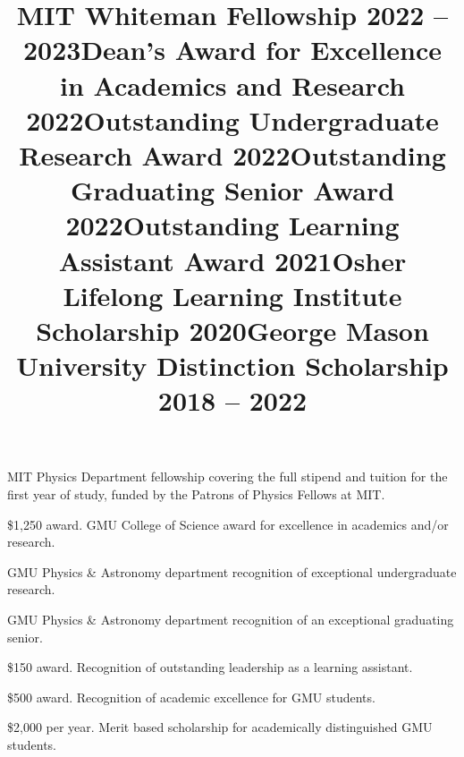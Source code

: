 \documentclass[marg, centered]{res}
\begin{document}
\begin{resume}
\vspace{-0.3cm}
\title{\textbf{MIT Whiteman Fellowship} \hfill \textbf{2022 -- 2023}}
\begin{position}
MIT Physics Department fellowship covering the full stipend and tuition for the first year of study, funded by the Patrons of Physics Fellows at MIT.
\end{position}

\vspace{-0.3cm}
\title{\textbf{Dean's Award for Excellence in Academics and Research} \hfill {\textbf{2022}}}
\begin{position}
\$1,250 award.  GMU College of Science award for excellence in academics and/or research.
\end{position}

\vspace{-0.3cm}
\title{\textbf{Outstanding Undergraduate Research Award} \hfill \textbf{2022}}
\begin{position}
GMU Physics \& Astronomy department recognition of exceptional undergraduate research.
\end{position}

\vspace{-0.3cm}
\title{\textbf{Outstanding Graduating Senior Award} \hfill \textbf{2022}}
\begin{position}
GMU Physics \& Astronomy department recognition of an exceptional graduating senior.
\end{position}

\vspace{-0.3cm}
\title{\textbf{Outstanding Learning Assistant Award} \hfill \textbf{2021}}
\begin{position}
\$150 award.  Recognition of outstanding leadership as a learning assistant.
\end{position}

\vspace{-0.3cm}
\title{\textbf{Osher Lifelong Learning Institute Scholarship} \hfill \textbf{2020}}
\begin{position}
\$500 award.  Recognition of academic excellence for GMU students.
\end{position}

\vspace{-0.3cm}
\title{\textbf{George Mason University Distinction Scholarship} \hfill \textbf{2018 -- 2022}}
\begin{position}
\$2,000 per year. Merit based scholarship for academically distinguished GMU students.
\end{position}


\end{resume}
\end{document}
